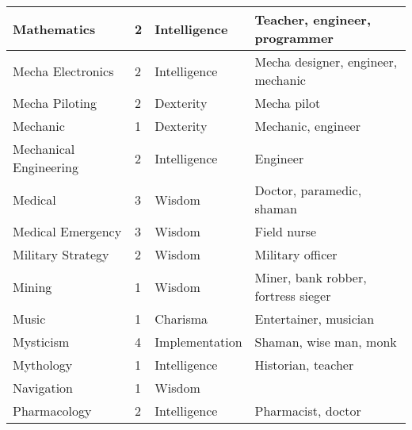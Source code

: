 \documentclass[twoside]{book}
\begin{document}
\begin{longtable}{p{1.25in}llp{12em}}
  \raggedright
           Mathematics 
  &
   2 
  &
   Intelligence 
  &
   Teacher, engineer,
           programmer 
  \tabularnewline
  \hline
      
  \raggedright
           Mecha Electronics 
  &
   2 
  &
   Intelligence 
  &
   Mecha designer, engineer,
           mechanic 
  \tabularnewline
  \hline
      
  \raggedright
           Mecha Piloting 
  &
   2 
  &
   Dexterity 
  &
   Mecha pilot 
  \tabularnewline
  \hline
      
  \raggedright
           Mechanic 
  &
   1 
  &
   Dexterity 
  &
   Mechanic, engineer
           
  \tabularnewline
  \hline
      
  \raggedright
           Mechanical Engineering 
  &
   2 
  &
   Intelligence 
  &
   Engineer 
  \tabularnewline
  \hline
      
  \raggedright
           Medical 
  &
   3 
  &
   Wisdom 
  &
   Doctor, paramedic, shaman
           
  \tabularnewline
  \hline
      
  \raggedright
           Medical Emergency 
  &
   3 
  &
   Wisdom 
  &
   Field nurse 
  \tabularnewline
  \hline
      
  \raggedright
           Military Strategy 
  &
   2 
  &
   Wisdom 
  &
   Military officer 
  \tabularnewline
  \hline
      
  \raggedright
           Mining 
  &
   1 
  &
   Wisdom 
  &
   Miner, bank robber,
           fortress sieger 
  \tabularnewline
  \hline
      
  \raggedright
           Music 
  &
   1 
  &
   Charisma 
  &
   Entertainer, musician
           
  \tabularnewline
  \hline
      
  \raggedright
           Mysticism 
  &
   4 
  &
   Implementation 
  &
   Shaman, wise man, monk
           
  \tabularnewline
  \hline
      
  \raggedright
           Mythology 
  &
   1 
  &
   Intelligence 
  &
   Historian, teacher
           
  \tabularnewline
  \hline
      
  \raggedright
           Navigation 
  &
   1 
  &
   Wisdom 
  \tabularnewline
  \hline
      
  \raggedright
           Pharmacology 
  &
   2 
  &
   Intelligence 
  &
   Pharmacist, doctor
           

\end{longtable}
\end{document}

